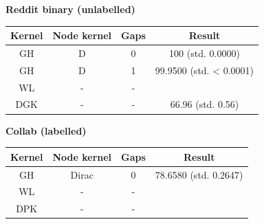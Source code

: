 \documentclass{article}
\begin{document}
\textbf{Reddit binary (unlabelled)}\\
\begin{minipage}{0.6\linewidth}
	\hspace*{-1in}

	\label{fig:reddit_binary_unlabelled}
\end{minipage}
\begin{minipage}[c]{0.5\linewidth}
	
	\centering
	\begin{tabular}{c|c|c|c}
		Kernel & Node kernel & Gaps & Result\\
		\hline
		GH & D & 0 & 100 (std. 0.0000)\\
		GH & D & 1 & 99.9500 (std. < 0.0001)\\
		WL & - & - & \\
		DGK & - & - & 66.96 (std. 0.56)
	\end{tabular}
	\label{table:reddit_binary_unlabelled}
\end{minipage}


\textbf{Collab (labelled)}\\
\begin{minipage}{0.6\linewidth}
	\hspace*{-1in}

	\label{fig:collab}
\end{minipage}
\begin{minipage}[c]{0.5\linewidth}
	
	\centering
	\begin{tabular}{c|c|c|c}
		Kernel & Node kernel & Gaps & Result\\
		\hline
		GH & Dirac & 0 & 78.6580 (std. 0.2647)\\
		WL & - & - & \\
		DPK & - & - & 
	\end{tabular}
	\label{table:collab}
\end{minipage}
\end{document}
